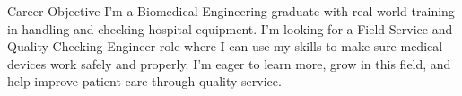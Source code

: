 \documentclass{resume}
\begin{document}

\begin{rSection}{Career Objective}
I’m a Biomedical Engineering graduate with real-world training in handling and checking hospital equipment. I’m looking for a Field Service and Quality Checking Engineer role where I can use my skills to make sure medical devices work safely and properly. I’m eager to learn more, grow in this field, and help improve patient care through quality service.
    
\end{rSection}
\end{document}

